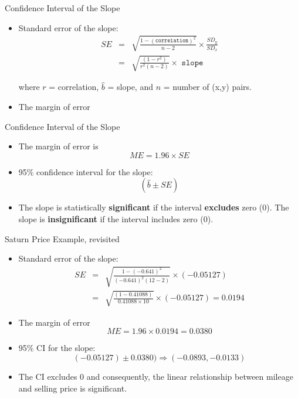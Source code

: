 \documentclass[14pt]{beamer}\usepackage[]{graphicx}\usepackage[]{color}
\begin{document}
\begin{frame}[fragile]{Confidence Interval of the Slope}

\begin{itemize}
\item Standard error of the slope:
\begin{eqnarray*}
SE &=& \sqrt{ \frac{ 1 - (\texttt{correlation})^2}{n - 2}} \times \frac{SD_y}{SD_x} \\
   &=& \sqrt{ \frac{ (1 - r^2)}{r^2 (n - 2)}} \times \texttt{ slope}
\end{eqnarray*}
  
where $r$ = correlation, $\hat{b}$ = slope, and $n$ = number of (x,y) pairs.  

\item The margin of error 
\end{itemize}

\end{frame}

\begin{frame}[fragile]{Confidence Interval of the Slope}

\begin{itemize}
  \item The margin of error is $$ME = 1.96 \times SE$$
  \item 95\% confidence interval for the slope:
  \begin{equation*}
    (\hat{b} \pm SE)
  \end{equation*}
  
\item The slope is statistically \textbf{significant} if the interval \textbf{excludes} zero (0). The  slope is \textbf{insignificant} if the interval includes zero (0).
  
\end{itemize}

\end{frame}

\begin{frame}[fragile]{Saturn Price Example, revisited}

{\small{
\begin{itemize}
\item Standard error of the slope:
{\footnotesize{
\begin{eqnarray*}
SE &=& \sqrt{ \frac{ 1 - (-0.641)^2}{(-0.641)^2 (12 - 2)}} \times (-0.05127) \\
   &=& \sqrt{ \frac{ (1 - 0.41088)}{0.41088 \times 10}} \times (-0.05127) = 0.0194
\end{eqnarray*}
}}
\item The margin of error $$ ME = 1.96 \times 0.0194 = 0.0380 $$

\item 95\% CI for the slope:
\begin{equation*}
(-0.05127) \pm 0.0380) \Rightarrow (-0.0893, -0.0133)
\end{equation*}

\item The CI excludes 0 and consequently, the linear relationship between mileage and selling price is significant.

\end{itemize}
}}
\end{frame}
\end{document}
